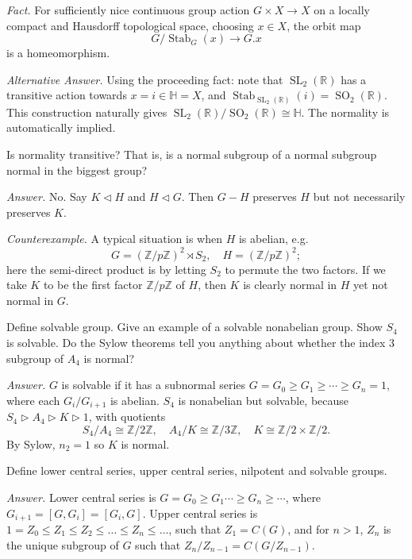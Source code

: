 \documentclass{mathproblems}
\newcommand\R{\mathbb{R}}
\newcommand\Z{\mathbb{Z}}
\begin{document}
\begin{questions}
{\color{violet}
\textit{Fact.} For sufficiently nice continuous group action $G\times X\to X$ on a locally compact and Hausdorff topological space, choosing $x\in X$, the orbit map
$$
G/\operatorname{Stab}_G (x)\longrightarrow G.x
$$
is a homeomorphism.
}

\textit{Alternative Answer.}
Using the proceeding fact: note that $\operatorname{SL}_2(\R)$ has a transitive action towards $x=i\in \mathbb{H}=X$, and $\operatorname{Stab}_{\operatorname{SL}_2(\R)} (i)=\operatorname{SO}_2(\R)$. This construction naturally gives $\operatorname{SL}_2(\R)/\operatorname{SO}_2(\R)\cong \mathbb{H}$. The normality is automatically implied.


\miquestion
{\color{blue} Is normality transitive? That is, is a normal subgroup of a normal subgroup normal in the biggest group?}

\textit{Answer.} No. Say $K\triangleleft H$ and $H\triangleleft G$. Then $G-H$ preserves $H$ but not necessarily preserves $K$.

\textit{Counterexample.} A typical situation is when $H$ is abelian, e.g. 
$$
G=(\Z/p\Z)^{2} \rtimes S_{2},\quad H=(\Z/p\Z)^{2};
$$
here the semi-direct product is by letting $S_{2}$ to permute the two factors. If we take $K$ to be the first factor $\Z/p\Z$ of $H$, then $K$ is clearly normal in $H$ yet not normal in $G$.


\miquestion
{\color{blue} Define solvable group. Give an example of a solvable nonabelian group. Show $S_4$ is solvable. Do the Sylow theorems tell you anything about whether the index 3 subgroup of $A_4$ is normal?}

\textit{Answer.} $G$ is solvable if it has a subnormal series $G=G_{0} \geqslant G_{1} \geqslant \cdots \geqslant G_{n}=1$, where each $G_i/G_{i+1}$ is abelian. $S_4$ is nonabelian but solvable, because $S_{4} \triangleright A_{4} \triangleright K \triangleright 1$, with quotients
$$
S_{4} / A_{4} \cong \Z / 2\Z, \quad A_{4} / K \cong \Z / 3\Z,\quad K \cong \Z / 2 \times \Z / 2.
$$
By Sylow, $n_2=1$ so $K$ is normal.


\miquestion
{\color{blue} Define lower central series, upper central series, nilpotent and solvable groups.}

\textit{Answer.} Lower central series is $G=G_0\geqslant G_1 \cdots \geqslant G_{n}\geqslant \cdots$, where $G_{i+1}=[G,G_i]=[G_i,G]$. Upper central series is $1=Z_{0} \leqslant Z_{1} \leqslant Z_{2} \leqslant \ldots \leqslant Z_{n} \leqslant \ldots$, such that $Z_{1}=C(G)$, and for $n>1$, $Z_{n}$ is the unique subgroup of $G$ such that $Z_{n} / Z_{n-1}=C(G / Z_{n-1})$.


\end{questions}
\end{document}
